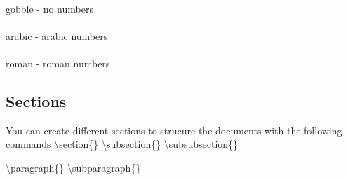 \documentclass{article}
\begin{document}
\paragraph{}
    gobble - no numbers
\paragraph{}
    arabic - arabic numbers
\paragraph{}
    roman - roman numbers

\subsection{Sections}
You can create different sections to strucure the documents with the following commands
\textbackslash section\{\}
\textbackslash subsection\{\}
\textbackslash subsubsection\{\}

\textbackslash paragraph\{\}
\textbackslash subparagraph\{\}
\end{document}
